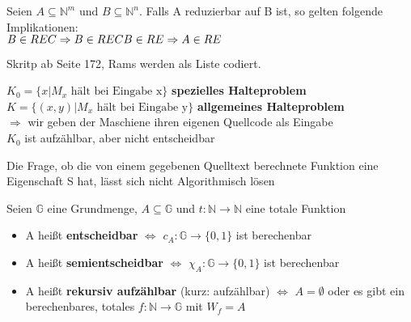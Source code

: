 \documentclass[14pt]{article}
\begin{document}
\begin{eigenschaft}
    Seien $A \subseteq \mathbb{N}^m$ und $B \subseteq \mathbb{N}^n$. Falls
    A reduzierbar auf B ist, so gelten folgende Implikationen: 
    \\
    $
        B \in REC \Rightarrow B \in REC \\  
        B \in RE \Rightarrow A \in RE
    $
\end{eigenschaft}
\begin{definition}[Gödelisierung]
    Skritp ab Seite 172, Rams werden als Liste codiert.
\end{definition}
\begin{definition}[Halteproblem]
    $K_0 = \{ x | M_x \text{ hält bei Eingabe x}\}$ 
        \textbf{spezielles Halteproblem} \\
    $K = \{ (x, y) | M_x \text{ hält bei Eingabe y}\}$ 
        \textbf{allgemeines Halteproblem} \\
    $\Rightarrow$ wir geben der Maschiene ihren eigenen Quellcode 
    als Eingabe \\
    $K_0$ ist aufzählbar, aber nicht entscheidbar
\end{definition}
\begin{definition}
    Die Frage, ob die von einem gegebenen Quelltext berechnete Funktion
    eine Eigenschaft S hat, lässt sich nicht Algorithmisch lösen
\end{definition}
\begin{definition}
    Seien $\mathbb{G}$ eine Grundmenge, $A \subseteq \mathbb{G}$
    und $t: \mathbb{N} \rightarrow \mathbb{N}$ eine totale Funktion
    \begin{itemize}
        \item A heißt \textbf{entscheidbar} $\Leftrightarrow$ $c_A :
        \mathbb{G} \rightarrow \{ 0, 1\}$ ist berechenbar
        \item A heißt \textbf{semientscheidbar} $\Leftrightarrow$ $\chi_A :
        \mathbb{G} \rightarrow \{ 0, 1\}$ ist berechenbar 
        \item A heißt \textbf{rekursiv aufzählbar} (kurz: aufzählbar) 
        $\Leftrightarrow$ $A = \emptyset$ oder es gibt ein berechenbares,
        totales $f: \mathbb{N} \rightarrow \mathbb{G}$ mit $W_f = A$
    \end{itemize}
\end{definition}
\end{document}
